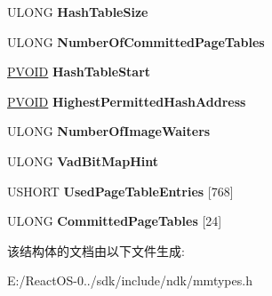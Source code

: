 \begin{DoxyCompactItemize}
U\+L\+O\+NG {\bfseries Hash\+Table\+Size}
\item 
\mbox{\label{struct___m_m_w_s_l_a77a1162ff2ac50a4bf2b8c594cc2c627}} 
U\+L\+O\+NG {\bfseries Number\+Of\+Committed\+Page\+Tables}
\item 
\mbox{\label{struct___m_m_w_s_l_ad24824a26c4cf4b7c2984bf0a95d169b}} 
\hyperlink{interfacevoid}{P\+V\+O\+ID} {\bfseries Hash\+Table\+Start}
\item 
\mbox{\label{struct___m_m_w_s_l_aecfbb5324c4db9c5e6612bd9301dabd2}} 
\hyperlink{interfacevoid}{P\+V\+O\+ID} {\bfseries Highest\+Permitted\+Hash\+Address}
\item 
\mbox{\label{struct___m_m_w_s_l_af478f66632d2212d8911db977a4df18c}} 
U\+L\+O\+NG {\bfseries Number\+Of\+Image\+Waiters}
\item 
\mbox{\label{struct___m_m_w_s_l_a5c5deedb3d000bcbb08483bfb4b7240a}} 
U\+L\+O\+NG {\bfseries Vad\+Bit\+Map\+Hint}
\item 
\mbox{\label{struct___m_m_w_s_l_a0897872506f52883f32647d553222b9e}} 
U\+S\+H\+O\+RT {\bfseries Used\+Page\+Table\+Entries} \mbox{[}768\mbox{]}
\item 
\mbox{\label{struct___m_m_w_s_l_aba4231c795395feab9680776f8c7fa90}} 
U\+L\+O\+NG {\bfseries Committed\+Page\+Tables} \mbox{[}24\mbox{]}
\end{DoxyCompactItemize}


该结构体的文档由以下文件生成\+:\begin{DoxyCompactItemize}
\item 
E\+:/\+React\+O\+S-\/0../sdk/include/ndk/mmtypes.\+h\end{DoxyCompactItemize}
